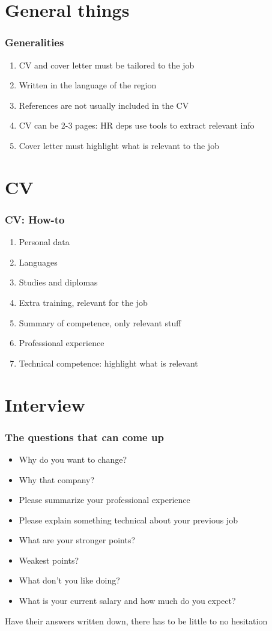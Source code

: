 \documentclass[]{beamer}
\begin{document}
\section{General things}
\begin{frame}
\frametitle{Generalities}
\begin{enumerate}
\item CV and cover letter must be tailored to the job
\item Written in the language of the region
\item References are not usually included in the CV
\item CV can be 2-3 pages: HR deps use tools to extract relevant info
\item Cover letter must highlight what is relevant to the job
\end{enumerate}
\end{frame}

\section{CV}
\begin{frame}
\frametitle{CV: How-to}
\begin{enumerate}
\item Personal data
\item Languages
\item Studies and diplomas
\item Extra training, relevant for the job
\item Summary of competence, only relevant stuff
\item Professional experience
\item Technical competence: highlight what is relevant
\end{enumerate}
\end{frame}

\section{Interview}
\begin{frame}
\frametitle{The questions that can come up}
\begin{itemize}
\item Why do you want to change?\pause
\item Why that company?\pause
\item Please summarize your professional experience\pause
\item Please explain something technical about your previous job\pause
\item What are your stronger points?\pause
\item Weakest points?\pause
\item What don't you like doing?\pause
\item What is your current salary and how much do you expect?\pause
\end{itemize}
Have their answers written down, there has to be little to no hesitation
\end{frame}
\end{document}
